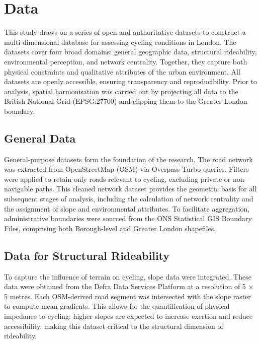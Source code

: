 \documentclass[
  12pt,
  oneside]{book}
\begin{document}
\chapter{Data}\label{data}

This study draws on a series of open and authoritative datasets to construct a multi-dimensional database for assessing cycling conditions in London. The datasets cover four broad domains: general geographic data, structural rideability, environmental perception, and network centrality. Together, they capture both physical constraints and qualitative attributes of the urban environment. All datasets are openly accessible, ensuring transparency and reproducibility. Prior to analysis, spatial harmonisation was carried out by projecting all data to the British National Grid (EPSG:27700) and clipping them to the Greater London boundary.

\section{General Data}\label{general-data}

General-purpose datasets form the foundation of the research. The road network was extracted from OpenStreetMap (OSM) via Overpass Turbo queries. Filters were applied to retain only roads relevant to cycling, excluding private or non-navigable paths. This cleaned network dataset provides the geometric basis for all subsequent stages of analysis, including the calculation of network centrality and the assignment of slope and environmental attributes. To facilitate aggregation, administrative boundaries were sourced from the ONS Statistical GIS Boundary Files, comprising both Borough-level and Greater London shapefiles.

\section{Data for Structural Rideability}\label{data-for-structural-rideability}

To capture the influence of terrain on cycling, slope data were integrated. These data were obtained from the Defra Data Services Platform at a resolution of 5 × 5 metres. Each OSM-derived road segment was intersected with the slope raster to compute mean gradients. This allows for the quantification of physical impedance to cycling: higher slopes are expected to increase exertion and reduce accessibility, making this dataset critical to the structural dimension of rideability.
\end{document}
